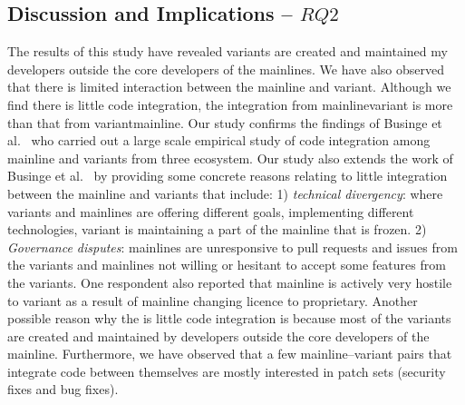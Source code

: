 \subsection{Discussion and Implications -- $RQ2$}

The results of this study have revealed variants are created and maintained my developers outside the core developers of the mainlines.
We have also observed that there is limited interaction between the mainline and variant.
Although we find there is little code integration, the integration from mainline\ra variant is more than that from variant\ra mainline.
Our study confirms the findings of Businge et al.~\cite{businge:emse:2021} who carried out a large scale empirical study of code integration among mainline and variants from three ecosystem. Our study also extends the work of Businge et al.~\cite{businge:emse:2021} by providing some concrete reasons relating to little integration between the mainline and variants that include: 1) \textit{technical divergency}: where variants and mainlines are offering different goals, implementing different technologies, variant is maintaining a part of the mainline that is frozen. 2) \textit{Governance disputes}: mainlines are unresponsive to pull requests and issues from the variants and  mainlines not willing or hesitant to accept some features from the variants. One respondent also reported that mainline is actively very hostile to variant as a result of mainline changing licence to proprietary.
Another possible reason why the is little code integration is because most of the variants are created and maintained by developers outside the core developers of the mainline.
Furthermore, we have observed that a few mainline--variant pairs that integrate code between themselves are mostly interested in patch sets (security fixes and bug fixes).


